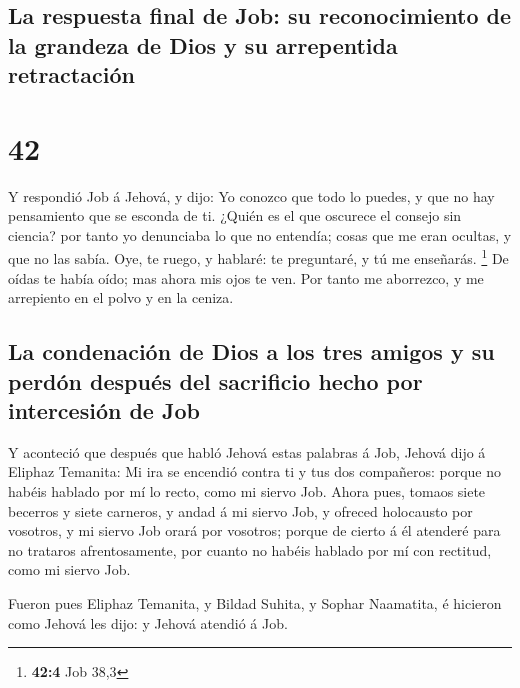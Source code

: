 \hypertarget{la-respuesta-final-de-job-su-reconocimiento-de-la-grandeza-de-dios-y-su-arrepentida-retractaciuxf3n}{%
\subsection{La respuesta final de Job: su reconocimiento de la grandeza
de Dios y su arrepentida
retractación}\label{la-respuesta-final-de-job-su-reconocimiento-de-la-grandeza-de-dios-y-su-arrepentida-retractaciuxf3n}}

\hypertarget{section-41}{%
\section{42}\label{section-41}}

 Y respondió Job á Jehová, y dijo:  Yo
conozco que todo lo puedes, y que no hay pensamiento que se esconda de
ti.  ¿Quién es el que oscurece el consejo sin ciencia? por
tanto yo denunciaba lo que no entendía; cosas que me eran ocultas, y que
no las sabía.  Oye, te ruego, y hablaré: te preguntaré, y
tú me enseñarás. \footnote{\textbf{42:4} Job 38,3}  De
oídas te había oído; mas ahora mis ojos te ven.  Por tanto
me aborrezco, y me arrepiento en el polvo y en la ceniza.

\hypertarget{la-condenaciuxf3n-de-dios-a-los-tres-amigos-y-su-perduxf3n-despuuxe9s-del-sacrificio-hecho-por-intercesiuxf3n-de-job}{%
\subsection{La condenación de Dios a los tres amigos y su perdón después
del sacrificio hecho por intercesión de
Job}\label{la-condenaciuxf3n-de-dios-a-los-tres-amigos-y-su-perduxf3n-despuuxe9s-del-sacrificio-hecho-por-intercesiuxf3n-de-job}}

 Y aconteció que después que habló Jehová estas palabras á
Job, Jehová dijo á Eliphaz Temanita: Mi ira se encendió contra ti y tus
dos compañeros: porque no habéis hablado por mí lo recto, como mi siervo
Job.  Ahora pues, tomaos siete becerros y siete carneros,
y andad á mi siervo Job, y ofreced holocausto por vosotros, y mi siervo
Job orará por vosotros; porque de cierto á él atenderé para no trataros
afrentosamente, por cuanto no habéis hablado por mí con rectitud, como
mi siervo Job.

 Fueron pues Eliphaz Temanita, y Bildad Suhita, y Sophar
Naamatita, é hicieron como Jehová les dijo: y Jehová atendió á Job.

